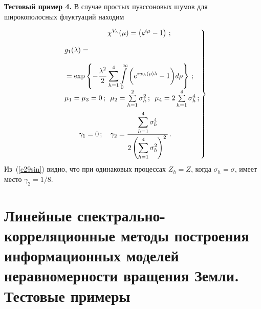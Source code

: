 \begin{multicols}{2}
\smallskip

\noindent
\textbf{Тестовый пример 4.}
В случае простых пуассоновых шумов для широкополосных флуктуаций находим

\noindent
\begin{equation}
\!    \left.
    \begin{array}{l}
\qquad\qquad\qquad  \chi^{V_h} (\mu) =\left( e^{i\mu}-1\right)\,;\\[12pt]
    g_1(\lambda) ={}\\[12pt]
    {}=\exp\left \{ -\displaystyle\frac{\displaystyle \lambda^2\mathstrut}{\displaystyle 2\mathstrut} \sum\limits_{h=1}^4 \displaystyle  
    \int\limits_0^\infty \bigg( e^{iw_h (\rho) \lambda} -1  \bigg ) d\rho
\right \}\,;\\[12pt]
    \mu_1 =\mu_3 =0\,;\enskip \mu_2= \sum\limits_{h=1}^2 \sigma_h^2\,;\enskip \mu_4 = 2\sum\limits_{h=1}^4 \sigma_h^4\,;\\[12pt]
\qquad   \gamma_1 =0\,;\quad \gamma_2 =\displaystyle\frac{\displaystyle \sum\limits_{h=1}^4 \sigma_h^4\mathstrut}{\displaystyle 2\left( \sum\limits_{h=1}^4 \sigma^2_h\right)^2\mathstrut}\,.
   \end{array}\!\!
   \right\}\!\!
   \label{e29sin}
   \end{equation}
Из~(\ref{e29sin}) видно, что при одинаковых процессах $Z_h=Z$, когда $\sigma_h=\sigma$, имеет место $\gamma_2 =1/8$.

 
\section{Линейные спектрально-корреляционные методы
построения информационных моделей неравномерности вращения Земли. Тестовые примеры }


\end{multicols}
